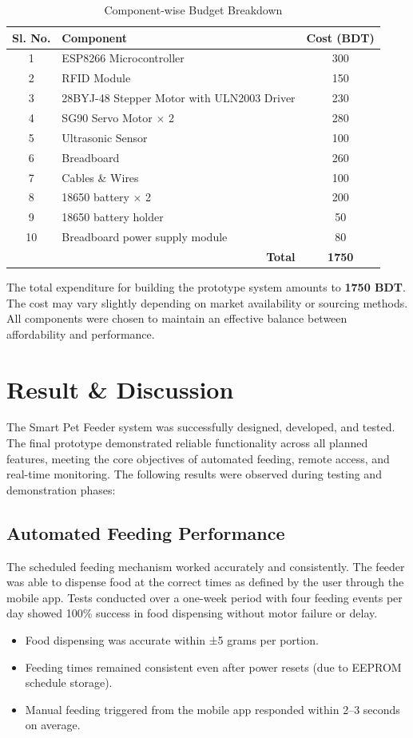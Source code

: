 \documentclass[10pt,a4paper]{extarticle}
\begin{document}
\begin{table}[H]
\centering
\renewcommand{\arraystretch}{1.4}
\begin{tabular}{|c|l|c|}
\hline
\textbf{Sl. No.} & \textbf{Component} & \textbf{Cost (BDT)} \\
\hline
1 & ESP8266 Microcontroller & 300 \\
2 & RFID Module & 150 \\
3 & 28BYJ-48 Stepper Motor with ULN2003 Driver & 230 \\
4 & SG90 Servo Motor $\times$ 2 & 280 \\
5 & Ultrasonic Sensor & 100 \\
6 & Breadboard  & 260 \\
7 & Cables \& Wires & 100 \\
8 & 18650 battery $\times$ 2 & 200 \\
9 & 18650 battery holder & 50 \\
10 & Breadboard power supply module & 80 \\
\hline
\multicolumn{2}{|r|}{\textbf{Total}} & \textbf{1750} \\
\hline
\end{tabular}
\caption{Component-wise Budget Breakdown}
\end{table}

The total expenditure for building the prototype system amounts to \textbf{1750 BDT}. The cost may vary slightly depending on market availability or sourcing methods. All components were chosen to maintain an effective balance between affordability and performance.


\section{Result \& Discussion}
The Smart Pet Feeder system was successfully designed, developed, and tested. The final prototype demonstrated reliable functionality across all planned features, meeting the core objectives of automated feeding, remote access, and real-time monitoring. The following results were observed during testing and demonstration phases:

\subsection{Automated Feeding Performance}
The scheduled feeding mechanism worked accurately and consistently. The feeder was able to dispense food at the correct times as defined by the user through the mobile app. Tests conducted over a one-week period with four feeding events per day showed 100\% success in food dispensing without motor failure or delay.
\begin{itemize}[parsep=0em]
    \item Food dispensing was accurate within ±5 grams per portion.
    \item Feeding times remained consistent even after power resets (due to EEPROM schedule storage).
    \item Manual feeding triggered from the mobile app responded within 2–3 seconds on average.
\end{itemize}
\end{document}
